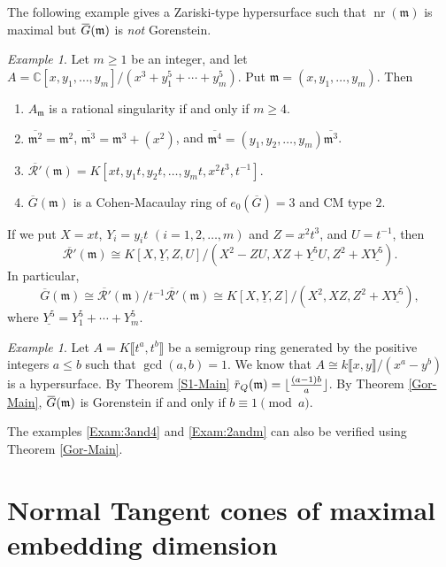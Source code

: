 \documentclass[12pt]{amsart}
\theoremstyle{definition}
\theoremstyle{remark}
\newtheorem{exam}[thm]{Example}
\numberwithin{equation}{section}
\newcommand{\m}{{\mathfrak m}}
\DeclareMathOperator{\nr}{{nr}}
\newcommand{\ol}[1]{\mkern 1.5mu\overline{\mkern-1.5mu#1\mkern-1.5mu}\mkern 1.5mu} %
\newcommand{\ols}[1]{\mskip.5\thinmuskip\overline{\mskip-.5\thinmuskip {#1} \mskip-.5\thinmuskip}\mskip.5\thinmuskip} %
\begin{document}
\par 
The following example gives a Zariski-type hypersurface 
such that $\nr(\m)$ is maximal but $\ols{G}(\m)$ is {\it not} Gorenstein. 
\begin{exam} \label{Ex3-5nonGor}
Let $m \ge 1$ be an integer, and  
let $A=\mathbb{C}[x, y_1, \ldots,y_m]/(x^3+y_1^5+\cdots+y_m^5)$. 
Put $\m = (x, y_1, \ldots, y_m)$. Then 
\begin{enumerate}
\item[\rm{(a)}] $A_{\m}$ is a rational singularity if and only if $m \ge 4$.  
\item[\rm{(b)}] $\overline{\m^2}=\m^2$, $\overline{\m^3}=\m^3+(x^2)$, 
and $\overline{\m^4}= (y_1, y_2, \ldots, y_m) \overline{\m^3}$. 
\item[\rm{(c)}] $\overline{\mathcal{R}'}(\m)=K[xt,y_1t,y_2t,\ldots,y_mt, x^2t^3,t^{-1}]$. 
\item[\rm{(d)}] $\overline{G}(\m)$ is a Cohen-Macaulay ring of $e_0(\overline{G})=3$ and CM type $2$. 
\end{enumerate} 
If we put $X=xt$, $Y_i=y_it$ $(i=1,2,\ldots,m)$ and $Z=x^2t^3$, and $U=t^{-1}$, 
then 
\[
\overline{\mathcal{R}'}(\m) \cong 
K[X,\underline{Y},Z,U]/(X^2-ZU, XZ+\underline{Y^5}U, Z^2+X\underline{Y^5}). 
\]
In particular, 
\[
\overline{G}(\m) \cong 
\overline{\mathcal{R}'}(\m)/t^{-1}\overline{\mathcal{R}'}(\m)
\cong K[X,\underline{Y},Z]/(X^2, XZ, Z^2+X\underline{Y^5}),
\]
where $\underline{Y^5}=Y_1^5+\cdots+Y_m^5$. 
\end{exam}

\begin{exam}
Let $A = K \llbracket t^a, t^b \rrbracket$ be a semigroup ring generated by the positive integers $a \leq b$ such that $\gcd(a,b)=1$. We know that $A \cong k\llbracket x, y \rrbracket/(x^a- y^b)$ is a hypersurface. By Theorem \ref{S1-Main} $\ol{r}_{Q}(\m) = \lfloor \frac{(a-1)b}{a}\rfloor$. 
By Theorem \ref{Gor-Main}, $\ol{G}(\m)$ is Gorenstein if and only if $b \equiv  1 \pmod{a}$.
\end{exam}
\par 
The examples \ref{Exam:3and4} and \ref{Exam:2andm} 
can also be verified using Theorem \ref{Gor-Main}.

\bigskip
\section{Normal Tangent cones of maximal embedding dimension}\label{sec:embdimGm}
\end{document}
